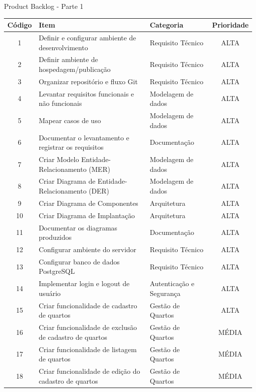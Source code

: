 \documentclass[
	12pt,				%
	openany,			%
	twoside,			%
	a4paper,			%
	english,			%
	french,				%
	spanish,			%
	brazil				%
	]{abntex2}
\begin{document}
\begin{quadro}[H]
	\caption{Product Backlog - Parte 1}
	\label{product_backlog}
	\begin{tabular}{|c|p{6.5cm}|p{3.8cm}|c|}
		\hline
		\textbf{Código} & \textbf{Item} & \textbf{Categoria} & \textbf{Prioridade} \\ \hline
		1 & Definir e configurar ambiente de desenvolvimento & Requisito Técnico   & ALTA    \\ \hline
		2 & Definir ambiente de hospedagem/publicação & Requisito Técnico & ALTA  \\ \hline
		3 & Organizar repositório e fluxo Git  & Requisito Técnico & ALTA\\ \hline
		4 & Levantar requisitos funcionais e não funcionais    & Modelagem de dados & ALTA    \\ \hline
		5 & Mapear casos de uso & Modelagem de dados   & ALTA  \\ \hline
		6 & Documentar o levantamento e registrar os requisitos    & Documentação   & ALTA    \\ \hline
		7 & Criar Modelo Entidade-Relacionamento (MER)    & Modelagem de dados   & ALTA    \\ \hline
		8 & Criar Diagrama de Entidade-Relacionamento (DER)    & Modelagem de dados   & ALTA    \\ \hline
		9 & Criar Diagrama de Componentes    & Arquitetura   & ALTA    \\ \hline
		10 & Criar Diagrama de Implantação    & Arquitetura   & ALTA    \\ \hline
		11 & Documentar os diagramas produzidos & Documentação &
		ALTA \\ \hline
		12 & Configurar ambiente do servidor & Requisito Técnico &
		ALTA \\ \hline
		13 & Configurar banco de dados PostgreSQL & Requisito Técnico &
		ALTA \\ \hline
		14 & Implementar login e logout de usuário & Autenticação e Segurança & ALTA \\ \hline
		15 & Criar funcionalidade de cadastro de quartos & Gestão de Quartos & ALTA \\ \hline
		16 & Criar funcionalidade de exclusão de cadastro de quartos &
		Gestão de Quartos & MÉDIA \\ \hline
		17 & Criar funcionalidade de listagem de quartos & Gestão de Quartos & MÉDIA \\ \hline
		18 & Criar funcionalidade de edição do cadastro de quartos &
		Gestão de Quartos &	MÉDIA \\ \hline
	\end{tabular}
\end{quadro}
\end{document}
